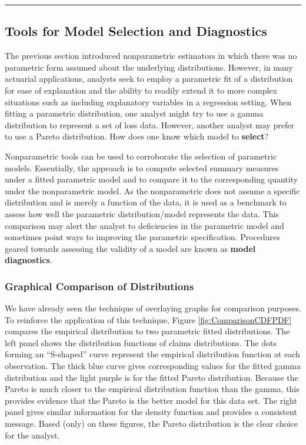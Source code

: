 \documentclass[]{book}
\theoremstyle{definition}
\theoremstyle{definition}
\theoremstyle{definition}
\theoremstyle{remark}
\begin{document}
\begin{center}\rule{0.5\linewidth}{\linethickness}\end{center}

\subsection{Tools for Model Selection and
Diagnostics}\label{S:MS:ToolsModelSelection}

The previous section introduced nonparametric estimators in which there
was no parametric form assumed about the underlying distributions.
However, in many actuarial applications, analysts seek to employ a
parametric fit of a distribution for ease of explanation and the ability
to readily extend it to more complex situations such as including
explanatory variables in a regression setting. When fitting a parametric
distribution, one analyst might try to use a gamma distribution to
represent a set of loss data. However, another analyst may prefer to use
a Pareto distribution. How does one know which model to \textbf{select}?

Nonparametric tools can be used to corroborate the selection of
parametric models. Essentially, the approach is to compute selected
summary measures under a fitted parametric model and to compare it to
the corresponding quantity under the nonparametric model. As the
nonparametric does not assume a specific distribution and is merely a
function of the data, it is used as a benchmark to assess how well the
parametric distribution/model represents the data. This comparison may
alert the analyst to deficiencies in the parametric model and sometimes
point ways to improving the parametric specification. Procedures geared
towards assessing the validity of a model are known as \textbf{model
diagnostics}.

\subsubsection{Graphical Comparison of
Distributions}\label{S:MS:GraphComparison}

We have already seen the technique of overlaying graphs for comparison
purposes. To reinforce the application of this technique, Figure
\ref{fig:ComparisonCDFPDF} compares the empirical distribution to two
parametric fitted distributions. The left panel shows the distribution
functions of claims distributions. The dots forming an ``S-shaped''
curve represent the empirical distribution function at each observation.
The thick blue curve gives corresponding values for the fitted gamma
distribution and the light purple is for the fitted Pareto distribution.
Because the Pareto is much closer to the empirical distribution function
than the gamma, this provides evidence that the Pareto is the better
model for this data set. The right panel gives similar information for
the density function and provides a consistent message. Based (only) on
these figures, the Pareto distribution is the clear choice for the
analyst.
\end{document}
